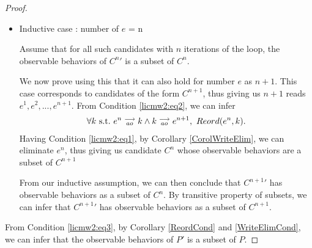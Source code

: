 \begin{proof}
\begin{itemize}
        \item Inductive case : number of $e$ = n

        Assume that for all such candidates with $n$ iterations of the loop, the observable behaviors of $C^n'$ is a subset of $C^n$.

        We now prove using this that it can also hold for number $e$ as $n + 1$. 
        This case corresponds to candidates of the form $C^{n+1}$, thus giving us $n+1$ reads $e^1, e^2,...,e^{n+1}$.
        From Condition \ref{licmw2:eq2}, we can infer 
        \begin{align*}
            \forall k \ \text{s.t.} \ e^n\stackrel{\longrightarrow}{_{ao}}k \wedge k\stackrel{\longrightarrow}{_{ao}}e^{n+1}, \ Reord(e^{n}, k).
        \end{align*}
        Having Condition \ref{licmw2:eq1}, by Corollary \ref{CorolWriteElim}, we can eliminate $e^{n}$, thus giving us candidate $C^{n}$ whose observable behaviors are a subset of $C^{n+1}$

        From our inductive assumption, we can then conclude that $C^{n+1}'$ has observable behaviors as a subset of $C^n$. 
        By transitive property of subsets, we can infer that $C^{n+1}'$ has observable behaviors as a subset of $C^{n+1}$.

    \end{itemize}
    
    From Condition \ref{licmw2:eq3}, by Corollary \ref{ReordCond} and \ref{WriteElimCond}, we can infer that the observable behaviors of $P'$ is a subset of $P$.

\end{proof}
